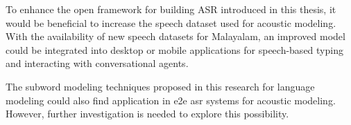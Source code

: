 To enhance the open framework for building ASR introduced in this thesis, it would be beneficial to increase the speech dataset used for acoustic modeling. With the availability of new speech datasets for Malayalam, an improved model could be integrated into desktop or mobile applications for speech-based typing and interacting with conversational agents.

The subword modeling techniques proposed in this research for language modeling could also find application in \gls{e2e} \gls{asr} systems for acoustic modeling. However, further investigation is needed to explore this possibility.


